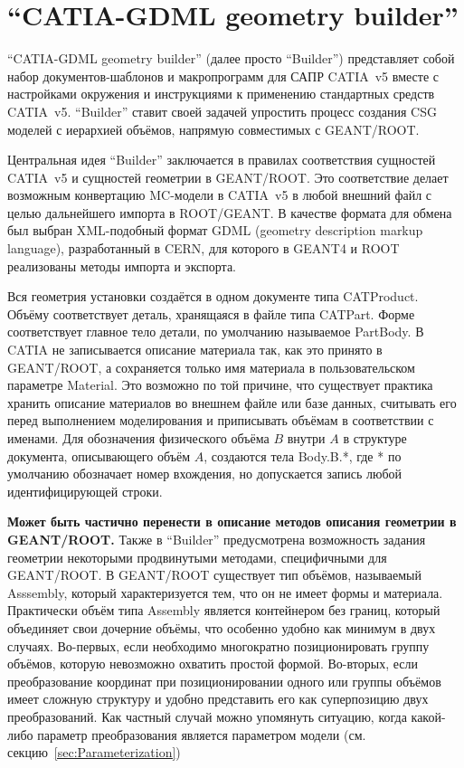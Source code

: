 \section{``CATIA-GDML geometry builder''}\label{sec:Builder}

``CATIA-GDML geometry builder'' (далее просто ``Builder'') представляет собой набор документов-шаблонов и макропрограмм для САПР CATIA~v5 вместе с настройками окружения и инструкциями к применению стандартных средств CATIA~v5. ``Builder'' ставит своей задачей упростить процесс создания CSG моделей с иерархией объёмов, напрямую совместимых с GEANT/ROOT.

Центральная идея ``Builder'' заключается в правилах соответствия сущностей CATIA~v5 и сущностей геометрии в GEANT/ROOT. Это соответствие делает возможным конвертацию MC-модели в CATIA~v5 в любой внешний файл с целью дальнейшего импорта в ROOT/GEANT. В качестве формата для обмена был выбран XML-подобный формат GDML (geometry description markup language), разработанный в CERN, для которого в GEANT4 и ROOT реализованы методы импорта и экспорта.

Вся геометрия установки создаётся в одном документе типа CATProduct. Объёму соответствует деталь, хранящаяся в файле типа CATPart. Форме соответствует главное тело детали, по умолчанию называемое PartBody. В CATIA не записывается описание материала так, как это принято в GEANT/ROOT, а сохраняется только имя материала в пользовательском параметре Material. Это возможно по той причине, что существует практика хранить описание материалов во внешнем файле или базе данных, считывать его перед выполнением моделирования и приписывать объёмам в соответствии с именами. Для обозначения физического объёма $B$ внутри $A$ в структуре документа, описывающего объём $A$, создаются тела Body.B.*, где * по умолчанию обозначает номер вхождения, но допускается запись любой идентифицирующей строки.

\textbf{Может быть частично перенести в описание методов описания геометрии в GEANT/ROOT.}
Также в ``Builder'' предусмотрена возможность задания геометрии некоторыми продвинутыми методами, специфичными для GEANT/ROOT. В GEANT/ROOT существует тип объёмов, называемый Asssembly, который характеризуется тем, что он не имеет формы и материала. Практически объём типа Assembly является контейнером без границ, который объединяет свои дочерние объёмы, что особенно удобно как минимум в двух случаях. Во-первых, если необходимо многократно позиционировать группу объёмов, которую невозможно охватить простой формой. Во-вторых, если преобразование координат при позиционировании одного или группы объёмов имеет сложную структуру и удобно представить его как суперпозицию двух преобразований. Как частный случай можно упомянуть ситуацию, когда какой-либо параметр преобразования является параметром модели (см. секцию~\ref{sec:Parameterization})

